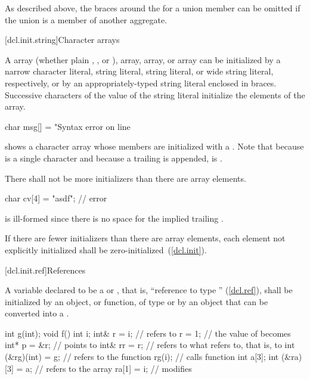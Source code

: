 \pnum
\enternote
As described above,
the braces around the
for a union member can be omitted if the
union is a member of another aggregate.
\exitnote

[dcl.init.string]{Character arrays}%

\pnum
A
array (whether plain
,
,
or
),
 array,
 array,
or  array
can be initialized by a
narrow character literal,  string literal,  string
literal, or wide string literal,
respectively, or by an appropriately-typed string literal enclosed in braces.
%
Successive
characters of the
value of the string literal
initialize the elements of the array.
\enterexample

\begin{codeblock}
char msg[] = "Syntax error on line %
\end{codeblock}

shows a character array whose members are initialized
with a
.
Note that because
is a single character and
because a trailing
is appended,
is
.
\exitexample

\pnum
There shall not be more initializers than there are array elements.
\enterexample

\begin{codeblock}
char cv[4] = "asdf";            // error
\end{codeblock}

is ill-formed since there is no space for the implied trailing
.
\exitexample

\pnum
If there are fewer initializers than there are array elements, each element not
explicitly initialized shall be zero-initialized~(\ref{dcl.init}).

[dcl.init.ref]{References}%

\pnum
A variable declared to be a
 or ,
that is, ``reference to type
''
(\ref{dcl.ref}),
shall be initialized by an object, or function, of type
or by an object that can be converted into a
.
\enterexample

\begin{codeblock}
int g(int);
void f() {
  int i;
  int& r = i;                   //  refers to 
  r = 1;                        // the value of  becomes 
  int* p = &r;                  //  points to 
  int& rr = r;                  //  refers to what  refers to, that is, to 
  int (&rg)(int) = g;           //  refers to the function 
  rg(i);                        // calls function 
  int a[3];
  int (&ra)[3] = a;             //  refers to the array 
  ra[1] = i;                    // modifies 
}
\end{codeblock}
\exitexample

